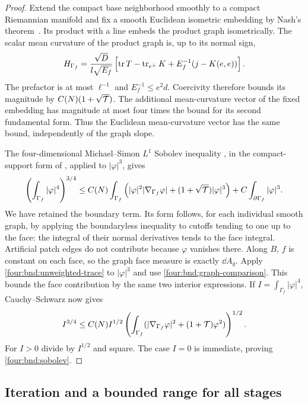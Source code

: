 \begin{proof}
Extend the compact base neighborhood smoothly to a compact
Riemannian manifold and fix a smooth Euclidean isometric embedding
by Nash's theorem~\cite[Theorem~2, p.~59]{Nash1956}.
Its product with a line embeds the product graph isometrically.
The scalar mean curvature of the product graph is, up to its normal
sign,
\[
 H_{\Gamma_f}=
 \frac{\sqrt D}{l\sqrt{E_f}}
 \left[\operatorname{tr} T-\operatorname{tr}_{e^\perp}K+E_f^{-1}(j-K(e,e))\right].
\]
The prefactor is at most $\ell^{-1}$ and
$E_f^{-1}\le e^2d$.  Coercivity therefore bounds its magnitude
by $C(N)(1+\sqrt{\mathcal T})$.  The additional mean-curvature vector
of the fixed embedding has magnitude at most four times the
bound for its second fundamental form.  Thus the Euclidean
mean-curvature vector has the same bound, independently of the
graph slope.

The four-dimensional Michael--Simon $L^1$ Sobolev inequality
\cite{MichaelSimon1973}, in the compact-support form of
\cite[Chapter~4, Section~5, Theorem~5.7, p.~98]{Simon2014}, applied
to $|\varphi|^3$, gives
\begin{align*}
 \left(\int_{\Gamma_f}|\varphi|^4\right)^{3/4}
 \le C(N)\int_{\Gamma_f}
 \left(|\varphi|^2|\nabla_{\Gamma_f}\varphi|
       +(1+\sqrt{\mathcal T})|\varphi|^3\right)
       +C\int_{\partial\Gamma_f}|\varphi|^3.
\end{align*}
We have retained the boundary term.  Its form follows, for each
individual smooth graph, by applying the boundaryless inequality
to cutoffs tending to one up to the face: the integral of their
normal derivatives tends to the face integral.  Artificial patch
edges do not contribute because $\varphi$ vanishes there.  Along
$B$, $f$ is constant on each face, so the graph face measure is
exactly $\dd A_g$.  Apply \eqref{four:bnd:unweighted-trace} to
$|\varphi|^3$ and use \eqref{four:bnd:graph-comparison}.  This bounds
the face contribution by the same two interior expressions.
If $I=\int_{\Gamma_f}|\varphi|^4$, Cauchy--Schwarz now gives
\[
 I^{3/4}\le C(N) I^{1/2}
 \left(\int_{\Gamma_f}
   (|\nabla_{\Gamma_f}\varphi|^2+(1+\mathcal T)\varphi^2)\right)^{1/2}.
\]
For $I>0$ divide by $I^{1/2}$ and square.  The case $I=0$ is
immediate, proving \eqref{four:bnd:sobolev}.
\end{proof}

\subsection{Iteration and a bounded range for all stages}

